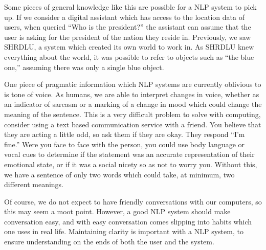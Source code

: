 Some pieces of general knowledge like this are possible for a NLP system to pick up. If we consider a digital assistant which has access to the location data of users, when queried ``Who is the president?'' the assistant can assume that the user is asking for the president of the nation they reside in. Previously, we saw SHRDLU, a system which created its own world to work in. As SHRDLU knew everything about the world, it was possible to refer to objects such as ``the blue one,'' assuming there was only a single blue object.

One piece of pragmatic information which NLP systems are currently oblivious to is tone of voice. As humans, we are able to interpret changes in voice, whether as an indicator of sarcasm or a marking of a change in mood which could change the meaning of the sentence. This is a very difficult problem to solve with computing, consider using a text based communication service with a friend. You believe that they are acting a little odd, so ask them if they are okay. They respond ``I'm fine.'' Were you face to face with the person, you could use body language or vocal cues to determine if the statement was an accurate representation of their emotional state, or if it was a social nicety so as not to worry you. Without this, we have a sentence of only two words which could take, at minimum, two different meanings.

Of course, we do not expect to have friendly conversations with our computers, so this may seem a moot point. However, a good NLP system should make conversation easy, and with easy conversation comes slipping into habits which one uses in real life. Maintaining clarity is important with a NLP system, to ensure understanding on the ends of both the user and the system.


